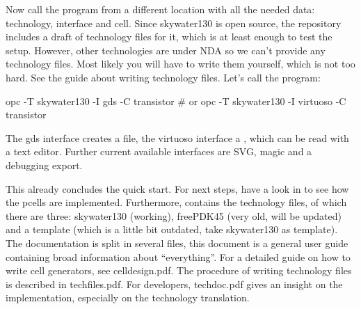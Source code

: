 Now call the program from a different location with all the needed data: technology, interface and cell. Since skywater130 is open source, the repository includes a
draft of technology files for it, which is at least enough to test the setup. However, other technologies are under NDA so we can't provide any technology files.
Most likely you will have to write them yourself, which is not too hard. See the guide about writing technology files. Let's call the program:
\begin{shellcode}
    opc -T skywater130 -I gds -C transistor
    # or
    opc -T skywater130 -I virtuoso -C transistor
\end{shellcode}
The gds interface creates a  file, the virtuoso interface a , which can be read with a text editor. Further
current available interfaces are SVG, magic and a debugging export.

This already concludes the quick start. For next steps, have a look in  to see how the pcells are implemented. Furthermore, 
contains the technology files, of which there are three: skywater130 (working), freePDK45 (very old, will be updated) and a template (which is a little bit outdated,
take skywater130 as template). The documentation is split in several files, this document is a general user guide containing broad information about
\enquote{everything}. For a detailed guide on how to write cell generators, see celldesign.pdf. The procedure of writing technology files is described in
techfiles.pdf. For developers, techdoc.pdf gives an insight on the implementation, especially on the technology translation.

